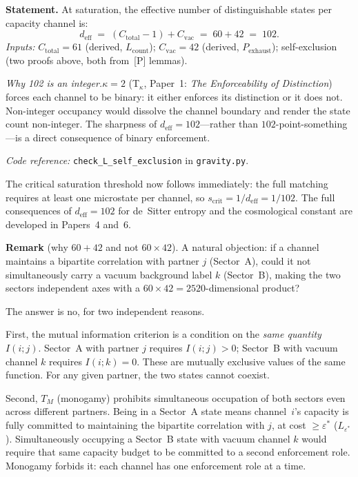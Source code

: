 \documentclass[11pt]{article}
\newcommand{\coderef}[2]{\smallskip\noindent\textit{Code reference:} \texttt{#1} in \texttt{#2}.}
\begin{document}
\begin{tcolorbox}[apfbox, title={$L_{\mathrm{self\text{-}excl}}$: Effective Dimension per Capacity Channel}]
\textbf{Statement.}  At saturation, the effective number of distinguishable states per capacity channel is:
\begin{equation}
d_{\mathrm{eff}} \;=\; (C_{\mathrm{total}} - 1) + C_{\mathrm{vac}} \;=\; 60 + 42 \;=\; 102.
\label{eq:deff}
\end{equation}
\textit{Inputs:} $C_{\mathrm{total}} = 61$ (derived, $L_{\mathrm{count}}$); $C_{\mathrm{vac}} = 42$ (derived, $P_{\mathrm{exhaust}}$); self-exclusion (two proofs above, both from~[P] lemmas).

\smallskip
\noindent\textit{Why 102 is an integer.}\quad $\kappa = 2$ (T$_\kappa$, Paper~1: \emph{The Enforceability of Distinction}) forces each channel to be binary: it either enforces its distinction or it does not.  Non-integer occupancy would dissolve the channel boundary and render the state count non-integer.  The sharpness of $d_{\mathrm{eff}} = 102$---rather than $102$-point-something---is a direct consequence of binary enforcement.

\coderef{check\_L\_self\_exclusion}{gravity.py}
\end{tcolorbox}

The critical saturation threshold now follows immediately: the full matching requires at least one microstate per channel, so $s_{\mathrm{crit}} = 1/d_{\mathrm{eff}} = 1/102$.  The full consequences of $d_{\mathrm{eff}} = 102$ for de~Sitter entropy and the cosmological constant are developed in Papers~4 and~6.

\smallskip
\noindent\textbf{Remark} (why $60 + 42$ and not $60 \times 42$).\quad
A natural objection: if a channel maintains a bipartite correlation with partner $j$ (Sector~A), could it not simultaneously carry a vacuum background label $k$ (Sector~B), making the two sectors independent axes with a $60 \times 42 = 2520$-dimensional product?

The answer is no, for two independent reasons.

First, the mutual information criterion is a condition on the \emph{same quantity} $I(i;j)$.  Sector~A with partner $j$ requires $I(i;j) > 0$; Sector~B with vacuum channel $k$ requires $I(i;k) = 0$.  These are mutually exclusive values of the same function.  For any given partner, the two states cannot coexist.

Second, $T_M$ (monogamy) prohibits simultaneous occupation of both sectors even across different partners.  Being in a Sector~A state means channel~$i$'s capacity is fully committed to maintaining the bipartite correlation with $j$, at cost $\ge \varepsilon^*$ ($L_{\varepsilon^*}$).  Simultaneously occupying a Sector~B state with vacuum channel $k$ would require that same capacity budget to be committed to a second enforcement role.  Monogamy forbids it: each channel has one enforcement role at a time.
\end{document}
